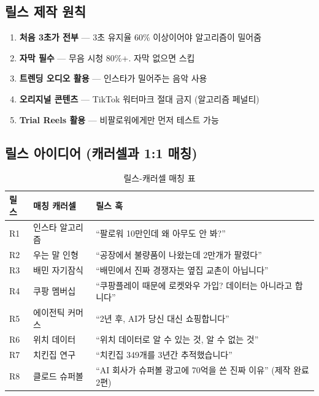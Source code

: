 \documentclass[11pt, a4paper]{article}
\begin{document}
\subsection{릴스 제작 원칙}

\begin{enumerate}[leftmargin=2em]
  \item \textbf{처음 3초가 전부} — 3초 유지율 60\% 이상이어야 알고리즘이 밀어줌
  \item \textbf{자막 필수} — 무음 시청 80\%+. 자막 없으면 스킵
  \item \textbf{트렌딩 오디오 활용} — 인스타가 밀어주는 음악 사용
  \item \textbf{오리지널 콘텐츠} — TikTok 워터마크 절대 금지 (알고리즘 페널티)
  \item \textbf{Trial Reels 활용} — 비팔로워에게만 먼저 테스트 가능
\end{enumerate}

\subsection{릴스 아이디어 (캐러셀과 1:1 매칭)}

\begin{table}[h!]
\centering
\begin{tabularx}{\textwidth}{l l Y}
\toprule
\textbf{릴스} & \textbf{매칭 캐러셀} & \textbf{릴스 훅} \\
\midrule
R1 & 인스타 알고리즘 & ``팔로워 10만인데 왜 아무도 안 봐?'' \\
R2 & 우는 말 인형 & ``공장에서 불량품이 나왔는데 2만개가 팔렸다'' \\
R3 & 배민 자기잠식 & ``배민에서 진짜 경쟁자는 옆집 교촌이 아닙니다'' \\
R4 & 쿠팡 멤버십 & ``쿠팡플레이 때문에 로켓와우 가입? 데이터는 아니라고 합니다'' \\
R5 & 에이전틱 커머스 & ``2년 후, AI가 당신 대신 쇼핑합니다'' \\
R6 & 위치 데이터 & ``위치 데이터로 알 수 있는 것, 알 수 없는 것'' \\
R7 & 치킨집 연구 & ``치킨집 349개를 3년간 추적했습니다'' \\
R8 & 클로드 슈퍼볼 & ``AI 회사가 슈퍼볼 광고에 70억을 쓴 진짜 이유'' (제작 완료 2편) \\
\bottomrule
\end{tabularx}
\caption{릴스-캐러셀 매칭 표}
\end{table}

\end{document}
